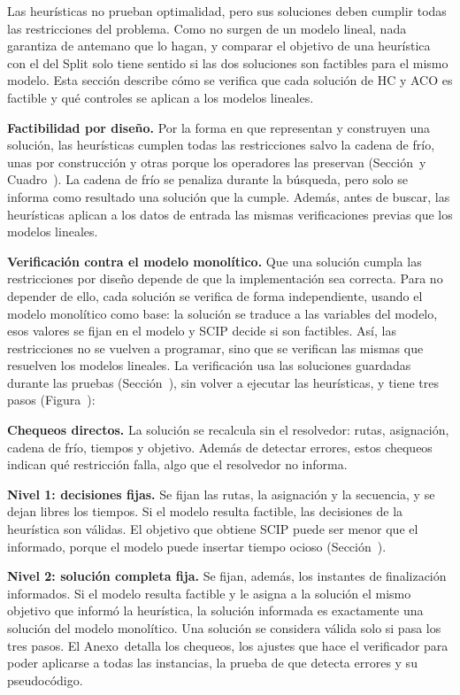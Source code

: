 \stopsection

\startsection[title={Validación de las soluciones}, reference=sec:validacion]

Las heurísticas no prueban optimalidad, pero sus soluciones deben cumplir
todas las restricciones del problema. Como no surgen de un modelo lineal,
nada garantiza de antemano que lo hagan, y comparar el objetivo de una
heurística con el del Split solo tiene sentido si las dos soluciones son
factibles para el mismo modelo. Esta sección describe cómo se verifica que
cada solución de HC y ACO es factible y qué controles se aplican a los
modelos lineales.

{\bf Factibilidad por diseño.} Por la forma en que representan y construyen
una solución, las heurísticas cumplen todas las restricciones salvo la
cadena de frío, unas por construcción y otras porque los operadores las
preservan (Sección~ y Cuadro~). La
cadena de frío se penaliza durante la búsqueda, pero solo se informa como
resultado una solución que la cumple. Además, antes de buscar, las
heurísticas aplican a los datos de entrada las mismas verificaciones previas
que los modelos lineales.

{\bf Verificación contra el modelo monolítico.} Que una solución cumpla las
restricciones por diseño depende de que la implementación sea correcta. Para
no depender de ello, cada solución se verifica de forma independiente,
usando el modelo monolítico como base: la solución se traduce a las
variables del modelo, esos valores se fijan en el modelo y
SCIP decide si son factibles. Así, las restricciones no se vuelven a
programar, sino que se verifican las mismas que resuelven los modelos
lineales. La verificación usa las soluciones guardadas durante las pruebas
(Sección~), sin volver a ejecutar las heurísticas, y tiene
tres pasos (Figura~):
\startitemize
	\item {\bf Chequeos directos.} La solución se recalcula sin el
	resolvedor: rutas, asignación, cadena de frío, tiempos y objetivo. Además
	de detectar errores, estos chequeos indican qué restricción falla, algo
	que el resolvedor no informa.
	\item {\bf Nivel 1: decisiones fijas.} Se fijan las rutas, la asignación
	y la secuencia, y se dejan libres los tiempos. Si el modelo resulta
	factible, las decisiones de la heurística son válidas. El objetivo que
	obtiene SCIP puede ser menor que el informado, porque el modelo puede
	insertar tiempo ocioso (Sección~).
	\item {\bf Nivel 2: solución completa fija.} Se fijan, además, los
	instantes de finalización informados. Si el modelo resulta factible y le
	asigna a la solución el mismo objetivo que informó la heurística, la
	solución informada es exactamente una solución del modelo monolítico.
\stopitemize
Una solución se considera válida solo si pasa los tres pasos. El
Anexo~ detalla los chequeos, los ajustes que hace el
verificador para poder aplicarse a todas las instancias, la prueba de que
detecta errores y su pseudocódigo.

